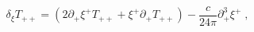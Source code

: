 \begin{equation}
\delta _{\xi }T_{++}=(2\partial _{+}\xi ^{+}T_{++}+\xi ^{+}\partial
_{+}T_{++})-\frac{c}{24\pi }\partial _{+}^{3}\xi ^{+}\;,  \label{DeltaTmnCFT}
\end{equation}

